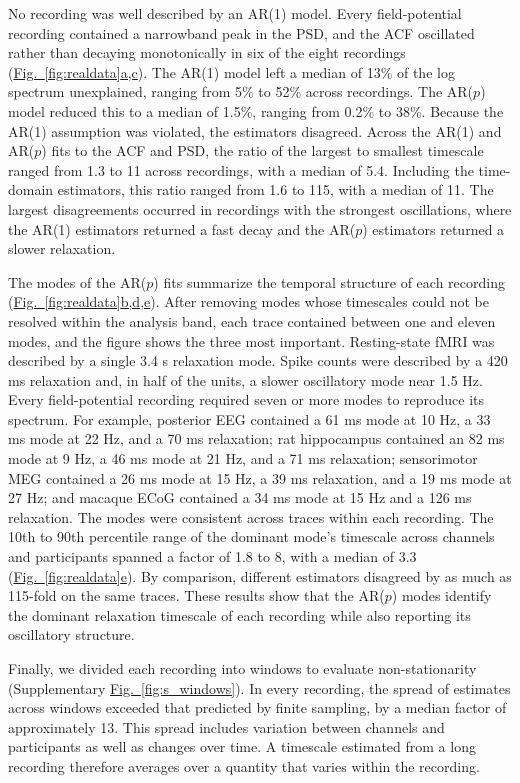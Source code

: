 \documentclass[pdflatex,sn-mathphys-num]{sn-jnl}
\newcommand{\figpanel}[2]{\hyperref[#1]{Fig.~\ref*{#1}#2}}
\begin{document}
No recording was well described by an AR(1) model. Every field-potential recording contained a narrowband peak in the PSD, and the ACF oscillated rather than decaying monotonically in six of the eight recordings (\figpanel{fig:realdata}{a,c}). The AR(1) model left a median of 13\% of the log spectrum unexplained, ranging from 5\% to 52\% across recordings. The AR($p$) model reduced this to a median of 1.5\%, ranging from 0.2\% to 38\%. Because the AR(1) assumption was violated, the estimators disagreed. Across the AR(1) and AR($p$) fits to the ACF and PSD, the ratio of the largest to smallest timescale ranged from 1.3 to 11 across recordings, with a median of 5.4. Including the time-domain estimators, this ratio ranged from 1.6 to 115, with a median of 11. The largest disagreements occurred in recordings with the strongest oscillations, where the AR(1) estimators returned a fast decay and the AR($p$) estimators returned a slower relaxation.

The modes of the AR($p$) fits summarize the temporal structure of each recording (\figpanel{fig:realdata}{b,d,e}). After removing modes whose timescales could not be resolved within the analysis band, each trace contained between one and eleven modes, and the figure shows the three most important. Resting-state fMRI was described by a single 3.4 s relaxation mode. Spike counts were described by a 420 ms relaxation and, in half of the units, a slower oscillatory mode near 1.5 Hz. Every field-potential recording required seven or more modes to reproduce its spectrum. For example, posterior EEG contained a 61 ms mode at 10 Hz, a 33 ms mode at 22 Hz, and a 70 ms relaxation; rat hippocampus contained an 82 ms mode at 9 Hz, a 46 ms mode at 21 Hz, and a 71 ms relaxation; sensorimotor MEG contained a 26 ms mode at 15 Hz, a 39 ms relaxation, and a 19 ms mode at 27 Hz; and macaque ECoG contained a 34 ms mode at 15 Hz and a 126 ms relaxation. The modes were consistent across traces within each recording. The 10th to 90th percentile range of the dominant mode's timescale across channels and participants spanned a factor of 1.8 to 8, with a median of 3.3 (\figpanel{fig:realdata}{e}). By comparison, different estimators disagreed by as much as 115-fold on the same traces. These results show that the AR($p$) modes identify the dominant relaxation timescale of each recording while also reporting its oscillatory structure.

Finally, we divided each recording into windows to evaluate non-stationarity (Supplementary \figpanel{fig:s_windows}{}). In every recording, the spread of estimates across windows exceeded that predicted by finite sampling, by a median factor of approximately 13. This spread includes variation between channels and participants as well as changes over time. A timescale estimated from a long recording therefore averages over a quantity that varies within the recording.
\end{document}
